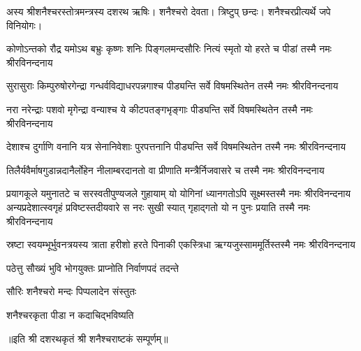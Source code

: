 

अस्य श्रीशनैश्चरस्तोत्रमन्त्रस्य दशरथ ऋषिः। शनैश्चरो देवता। त्रिष्टुप् छन्दः। शनैश्चरप्रीत्यर्थे जपे विनियोगः।


\twolineshloka
{कोणोऽन्तको रौद्र यमोऽथ बभ्रुः कृष्णः शनिः पिङ्गलमन्दसौरिः}
{नित्यं स्मृतो यो हरते च पीडां तस्मै नमः श्रीरविनन्दनाय}

\twolineshloka
{सुरासुराः किम्पुरुषोरगेन्द्रा गन्धर्वविद्याधरपन्नगाश्च}
{पीड्यन्ति सर्वे विषमस्थितेन तस्मै नमः श्रीरविनन्दनाय}

\twolineshloka
{नरा नरेन्द्राः पशवो मृगेन्द्रा वन्याश्च ये कीटपतङ्गभृङ्गाः}
{पीड्यन्ति सर्वे विषमस्थितेन तस्मै नमः श्रीरविनन्दनाय}

\twolineshloka
{देशाश्च दुर्गाणि वनानि यत्र सेनानिवेशाः पुरपत्तनानि}
{पीड्यन्ति सर्वे विषमस्थितेन तस्मै नमः श्रीरविनन्दनाय}

\twolineshloka
{तिलैर्यवैर्माषगुडान्नदानैर्लोहेन नीलाम्बरदानतो वा}
{प्रीणाति मन्त्रैर्निजवासरे च तस्मै नमः श्रीरविनन्दनाय}

\twolineshloka
{प्रयागकूले यमुनातटे च सरस्वतीपुण्यजले गुहायाम्}
{यो योगिनां ध्यानगतोऽपि सूक्ष्मस्तस्मै नमः श्रीरविनन्दनाय}
\twolineshloka
{अन्यप्रदेशात्स्वगृहं प्रविष्टस्तदीयवारे स नरः सुखी स्यात्}
{गृहाद्गतो यो न पुनः प्रयाति तस्मै नमः श्रीरविनन्दनाय}

\twolineshloka
{स्रष्टा स्वयम्भूर्भुवनत्रयस्य त्राता हरीशो हरते पिनाकी}
{एकस्त्रिधा ऋग्यजुस्साममूर्तिस्तस्मै नमः श्रीरविनन्दनाय}

{पठेत्तु सौख्यं भुवि भोगयुक्तः प्राप्नोति निर्वाणपदं तदन्ते}

{सौरिः शनैश्चरो मन्दः पिप्पलादेन संस्तुतः}

{शनैश्चरकृता पीडा न कदाचिद्भविष्यति}

॥इति श्री दशरथकृतं श्री शनैश्चराष्टकं सम्पूर्णम्॥

